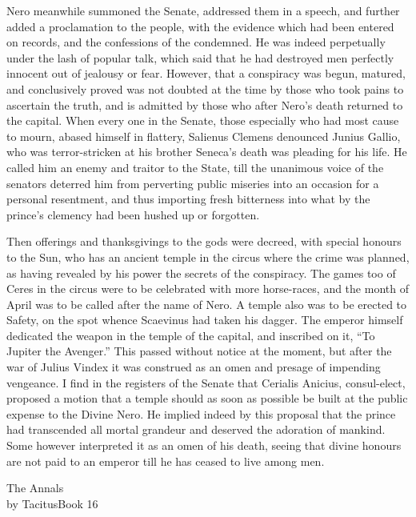 
Nero meanwhile summoned the Senate, addressed them in a speech, and further added a proclamation to the people, with the evidence which had been entered on records, and the confessions of the condemned. He was indeed perpetually under the lash of popular talk, which said that he had destroyed men perfectly innocent out of jealousy or fear. However, that a conspiracy was begun, matured, and conclusively proved was not doubted at the time by those who took pains to ascertain the truth, and is admitted by those who after Nero's death returned to the capital. When every one in the Senate, those especially who had most cause to mourn, abased himself in flattery, Salienus Clemens denounced Junius Gallio, who was terror-stricken at his brother Seneca's death was pleading for his life. He called him an enemy and traitor to the State, till the unanimous voice of the senators deterred him from perverting public miseries into an occasion for a personal resentment, and thus importing fresh bitterness into what by the prince's clemency had been hushed up or forgotten.


Then offerings and thanksgivings to the gods were decreed, with special honours to the Sun, who has an ancient temple in the circus where the crime was planned, as having revealed by his power the secrets of the conspiracy. The games too of Ceres in the circus were to be celebrated with more horse-races, and the month of April was to be called after the name of Nero. A temple also was to be erected to Safety, on the spot whence Scaevinus had taken his dagger. The emperor himself dedicated the weapon in the temple of the capital, and inscribed on it, ``To Jupiter the Avenger.'' This passed without notice at the moment, but after the war of Julius Vindex it was construed as an omen and presage of impending vengeance. I find in the registers of the Senate that Cerialis Anicius, consul-elect, proposed a motion that a temple should as soon as possible be built at the public expense to the Divine Nero. He implied indeed by this proposal that the prince had transcended all mortal grandeur and deserved the adoration of mankind. Some however interpreted it as an omen of his death, seeing that divine honours are not paid to an emperor till he has ceased to live among men.


The Annals\\
by TacitusBook 16

